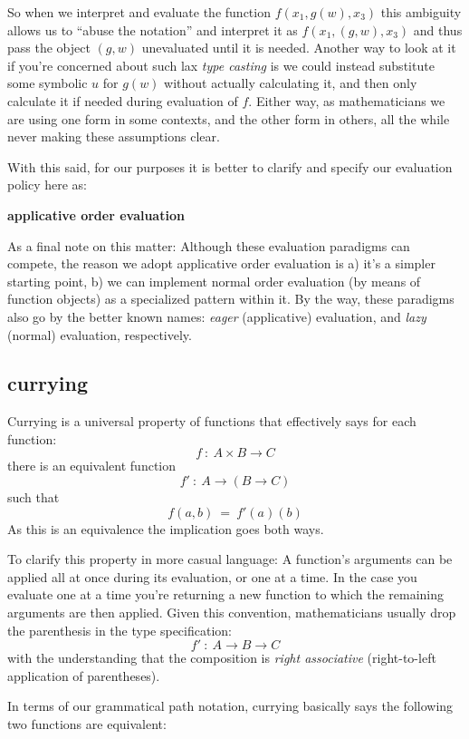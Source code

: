 \documentclass[twoside]{article}
\begin{document}
So when we interpret and evaluate the function $ f(x_1,g(w),x_3) $ this ambiguity allows us to ``abuse the notation''
and interpret it as $ f(x_1,(g,w),x_3) $ and thus pass the object $ (g,w) $ unevaluated until it is needed. Another
way to look at it if you're concerned about such lax \emph{type casting} is we could instead substitute some symbolic
$ u $ for $ g(w) $ without actually calculating it, and then only calculate it if needed during evaluation of $ f $.
Either way, as mathematicians we are using one form in some contexts, and the other form in others, all the while
never making these assumptions clear.

With this said, for our purposes it is better to clarify and specify our evaluation policy here as:
\begin{center}
\bfseries applicative order evaluation
\end{center}

As a final note on this matter: Although these evaluation paradigms can compete, the reason we adopt applicative
order evaluation is a) it's a simpler starting point, b) we can implement normal order evaluation (by means of
function objects) as a specialized pattern within it. By the way, these paradigms also go by the better known
names: \emph{eager} (applicative) evaluation, and \emph{lazy} (normal) evaluation, respectively.

\subsection*{currying}

Currying is a universal property of functions that effectively says for each function:
$$ f\ :\ A \times B \to C $$
there is an equivalent function
$$ f'\ :\ A \to (B \to C) $$
such that 
$$ f(a,b)\ =\ f'(a)(b)	$$
As this is an equivalence the implication goes both ways.

To clarify this property in more casual language: A function's arguments can be applied all at once during its evaluation,
or one at a time. In the case you evaluate one at a time you're returning a new function to which the remaining arguments
are then applied. Given this convention, mathematicians usually drop the parenthesis in the type specification:
$$ f'\ :\ A \to B \to C $$
with the understanding that the composition is \emph{right associative} (right-to-left application of parentheses).

In terms of our grammatical path notation, currying basically says the following two functions are equivalent:
\end{document}
